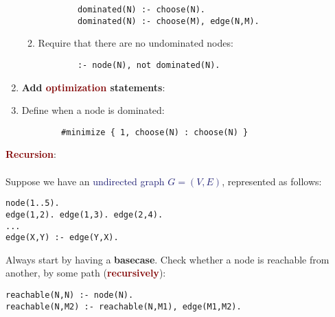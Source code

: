 \begin{enumerate}
\begin{enumerate}
        \begin{lstlisting}
        dominated(N) :- choose(N).
        dominated(N) :- choose(M), edge(N,M).
        \end{lstlisting}
        \item Require that there are  \textcolor{PineGreen}{no undominated} nodes:
        \begin{lstlisting}
        :- node(N), not dominated(N).
        \end{lstlisting}
    \end{enumerate}
    \item \textbf{Add \textcolor{Maroon}{optimization} statements}:
    \item Define when a node is \textcolor{PineGreen}{dominated}:
        \begin{lstlisting}
        #minimize { 1, choose(N) : choose(N) }
        \end{lstlisting}
\end{enumerate}

\newpage

{\Large \textbf{\textcolor{Maroon}{Recursion}}}: \\
\\
Suppose we have an \textcolor{MidnightBlue}{undirected graph $G = (V,E)$}, represented as follows:
\begin{lstlisting}
node(1..5).
edge(1,2). edge(1,3). edge(2,4).
...
edge(X,Y) :- edge(Y,X).
\end{lstlisting}

\vspace{0.35cm}

Always start by having a \textbf{basecase}. Check whether a node is reachable from another, by some path (\textbf{\textcolor{Maroon}{recursively}}):
\begin{lstlisting}
reachable(N,N) :- node(N).
reachable(N,M2) :- reachable(N,M1), edge(M1,M2).
\end{lstlisting}